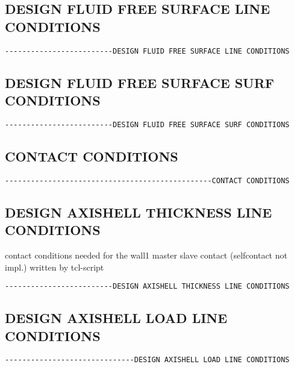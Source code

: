 
\subsection{DESIGN FLUID FREE SURFACE LINE CONDITIONS}
\begin{verbatim}
-------------------------DESIGN FLUID FREE SURFACE LINE CONDITIONS
\end{verbatim}


\subsection{DESIGN FLUID FREE SURFACE SURF CONDITIONS}
\begin{verbatim}
-------------------------DESIGN FLUID FREE SURFACE SURF CONDITIONS
\end{verbatim}


\subsection{CONTACT CONDITIONS}
\begin{verbatim}
------------------------------------------------CONTACT CONDITIONS
\end{verbatim}



\subsection{DESIGN AXISHELL THICKNESS LINE CONDITIONS}
contact conditions needed for the wall1  master slave contact (selfcontact not impl.) written by tcl-script
\begin{verbatim}
-------------------------DESIGN AXISHELL THICKNESS LINE CONDITIONS
\end{verbatim}


\subsection{DESIGN AXISHELL LOAD LINE CONDITIONS}
\begin{verbatim}
------------------------------DESIGN AXISHELL LOAD LINE CONDITIONS
\end{verbatim}


